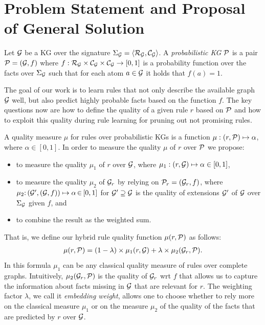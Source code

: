 \section{Problem Statement and Proposal of General Solution} 
Let $\mathcal{G}$ be a KG over the signature $\Sigma_{\mathcal{G}}=\langle\mathcal{R}_\mathcal{G},\mathcal{C}_\mathcal{G}\rangle$. 
A \emph{probabilistic KG} $\mathcal{P}$ is a pair $\mathcal{P} = (\mathcal{G},f)$ 
where $f:\mathcal{R}_\mathcal{G}\times \mathcal{C}_\mathcal{G} \times \mathcal{C}_\mathcal{G}\rightarrow [0,1]$ is a probability function over the facts over $\Sigma_{\mathcal{G}}$ such that for each atom $a \in \mathcal{G} $ it holds that $f(a) = 1$.

The goal of our work is to learn rules that not only describe the available graph $\mathcal{G}$ well, but also predict highly probable facts based on the function $f$.
The key questions now are how to define the quality of a given rule $r$ based on $\mathcal{P}$ and how to exploit this quality during rule learning for pruning out not promising rules. 


A quality measure $\mu$ for rules over probabilistic KGs 
is a function $\mu: (r,\mathcal{P}) \mapsto \alpha$, where $\alpha \in  [0,1]$.
In order to measure the quality $\mu$ of $r$ over $\mathcal{P}$ we propose: 
\begin{itemize}
\item 
to measure the quality $\mu_1$ of $r$ over $\mathcal{G}$, where $\mu_1: (r,\mathcal{G}) \mapsto \alpha \in  [0,1]$,
\item
to measure the quality $\mu_2$ of $\mathcal{G}_r$ by relying on $\mathcal{P}_r=(\mathcal{G}_r,f)$, 
where $\mu_2{:}\, (\mathcal{G}'{,}\, (\mathcal{G},f)) \mapsto  \alpha \,{\in}\, [0,1]$ for $\mathcal{G}' \supseteq \mathcal{G}$ is the quality of extensions $\mathcal{G}'$ of $\mathcal{G}$ over $\Sigma_\mathcal{G}$ given $f$,
and 
\item
to combine the result as the weighted sum.
\end{itemize}
That is, we define our hybrid rule quality function $\mu(r,\mathcal{P})$ as follows:
\begin{align}\label{eq:hm}
	\mu(r,\mathcal{P})= (1 - \lambda)\times \mu_1(r,\mathcal{G}) + \lambda \times \mu_2(\mathcal{G}_r,\mathcal{P}).
\end{align}
In this formula $\mu_1$ can be any classical quality measure of rules over complete graphs. %
Intuitively, $\mu_2(\mathcal{G}_r,\mathcal{P})$ is the quality of $\mathcal{G}_r$ wrt $f$ that allows us to capture the information about facts missing in $\mathcal{G}$ that are relevant for $r$.
The weighting factor %
$\lambda$, we call it \textit{embedding weight}, allows one to choose whether %
to rely more on the classical measure $\mu_1$ or on the measure $\mu_2$ of the quality of the facts that 
are predicted by $r$ over $\mathcal{G}$.

